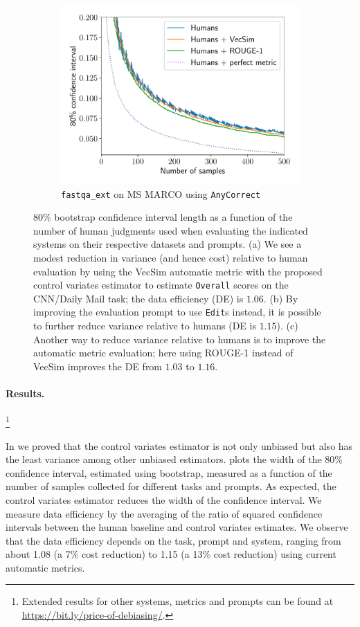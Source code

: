 \begin{figure}[th]
\begin{subfigure}[b]{0.32\textwidth}
  \includegraphics[width=\textwidth]{figures/msmarco_trajectory}
  \caption{\label{fig:trajectory-c}\texttt{fastqa\_ext} on MS MARCO using \texttt{AnyCorrect}}
  \end{subfigure}
  \caption{\label{fig:trajectory} 80\% bootstrap confidence interval length as a function of the number of human judgments used when evaluating the indicated systems on their respective datasets and prompts.
  (a) We see a modest reduction in variance (and hence cost) relative to human evaluation by using the VecSim automatic metric with the proposed control variates estimator to estimate \texttt{Overall} scores on the CNN/Daily Mail task; the data efficiency (DE) is $1.06$.
  (b) By improving the evaluation prompt to use \texttt{Edit}s instead, it is possible to further reduce variance relative to humans (DE is $1.15$).
  (c) Another way to reduce variance relative to humans is to improve the automatic metric evaluation; here using ROUGE-1 instead of VecSim improves the DE from $1.03$ to $1.16$.
  }
\end{figure}

\paragraph{Results.}\footnote{%
  Extended results for other systems, metrics and prompts can be found at \url{https://bit.ly/price-of-debiasing/}.}
  
In  we proved that the control variates estimator is not only unbiased but also has the least variance among other unbiased estimators.
 plots the width of the 80\% confidence interval, estimated using bootstrap, measured as a function of the number of samples collected for different tasks and prompts.
As expected, the control variates estimator reduces the width of the confidence interval. 
We measure data efficiency by the averaging of the ratio of squared confidence intervals between the human baseline and control variates estimates.
We observe that the data efficiency depends on the task, prompt and system, ranging from about 1.08 (a 7\% cost reduction) to 1.15 (a 13\% cost reduction) using current automatic metrics.

